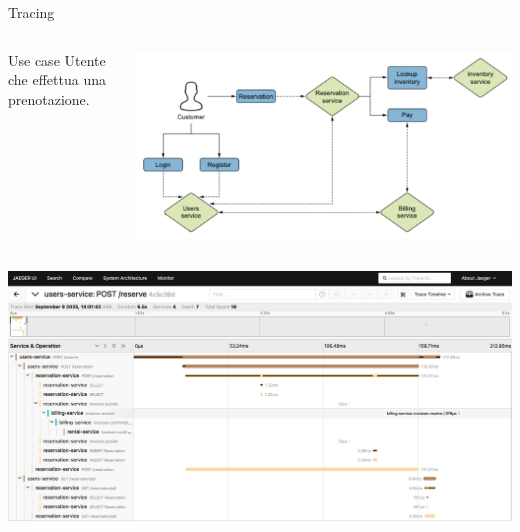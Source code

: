 \begin{frame}{Tracing}
    \begin{columns}
        \begin{column}{.4\textwidth}
            \centering
            \begin{block}{Use case}
                Utente che effettua una prenotazione.
            \end{block}
        \end{column}
        \begin{column}{.6\textwidth}
            \centering
            \includegraphics[width=.7\textwidth]{images/4-tracing/use cases.pdf}
        \end{column}
    \end{columns}
    \centering
    \includegraphics[width=.8\textwidth]{images/4-tracing/jaeger use case.pdf}
\end{frame}